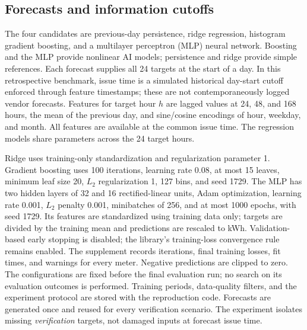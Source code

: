 \documentclass[12pt]{article}
\begin{document}
\subsection{Forecasts and information cutoffs}
The four candidates are previous-day persistence, ridge regression,
histogram gradient boosting, and a multilayer perceptron (MLP) neural
network. Boosting and the MLP provide nonlinear AI models; persistence and
ridge provide simple references. Each forecast supplies all 24 targets at
the start of a day. In this retrospective benchmark, issue time is a
simulated historical day-start cutoff enforced through feature timestamps;
these are not contemporaneously logged vendor forecasts.
Features for target hour $h$ are lagged values at 24, 48, and 168 hours,
the mean of the previous day, and sine/cosine encodings of hour, weekday,
and month. All features are available at the common issue time. The
regression models share parameters across the 24 target hours.

Ridge uses training-only standardization and regularization parameter 1.
Gradient boosting uses 100 iterations, learning rate 0.08, at most 15
leaves, minimum leaf size 20, $L_2$ regularization 1, 127 bins, and seed
1729. The MLP has two hidden layers of 32 and 16 rectified-linear units,
Adam optimization, learning rate 0.001, $L_2$ penalty 0.001, minibatches
of 256, and at most 1000 epochs, with seed 1729. Its features are standardized
using training data only; targets are divided by the training mean and
predictions are rescaled to kWh. Validation-based early stopping is disabled;
the library's training-loss convergence rule remains enabled. The supplement
records iterations, final training losses, fit times, and warnings for every
meter. Negative predictions are clipped to zero. The configurations are
fixed before the final evaluation run; no search on its evaluation outcomes is
performed. Training periods,
data-quality filters, and the experiment protocol are stored with the
reproduction code. Forecasts are generated once and reused for every
verification scenario. The experiment isolates missing \emph{verification}
targets, not damaged inputs at forecast issue time.
\end{document}
